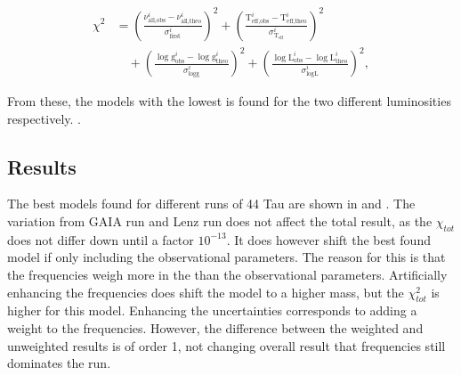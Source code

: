 \begin{align}
\chi^2 &= \left(\frac{\nu_{\text{all,obs}}^i-\nu^i_{\text{all,theo}}}{\sigma^i_{\text{first}}}\right)^2
 +
         \left(\frac{\text{T}_\text{eff,obs}^i-\text{T}_\text{eff,theo}^i}{\sigma^i_{\text{T}_\text{eff}}}\right)^2  \nonumber \\
  & \quad +
\left(\frac{\log \text{g}_\text{obs}^i-\log \text{g}_\text{theo}^i}{\sigma^i_{\log \text{g}}}\right)^2  + \left(\frac{\log \text{L}_\text{obs}^i-\log \text{L}_\text{theo}^i}{\sigma^i_{\log \text{L}}}\right)^2, 
 \label{eq:chis_all}
\end{align}

From these, the models with the lowest \chis is found for the two different luminosities respectively. . 

\subsection{Results}
The best models found for different runs of 44 Tau are shown in  and . The variation from GAIA run and Lenz run does not affect the total result, as the $\chi_{tot}$ does not differ down until a factor $10^{-13}$. It does however shift the best found model if only including the observational parameters. The reason for this is that the frequencies weigh more in the \chis than the observational parameters. Artificially enhancing the frequencies does shift the model to a higher mass, but the $\chi_{ tot}^2$ is higher for this model. Enhancing the uncertainties corresponds to adding a weight to the frequencies. However, the difference between the weighted and unweighted results is of order 1, not changing overall result that frequencies still dominates the run. 

